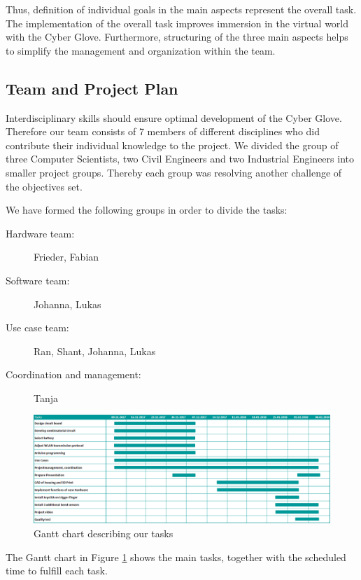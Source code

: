 Thus, definition of individual goals in the main aspects represent the overall task. The implementation of the overall task improves immersion in the virtual world with the Cyber Glove. Furthermore, structuring of the three main aspects helps to simplify the management and organization within the team.



\subsection{Team and Project Plan}

Interdisciplinary skills should ensure optimal development of the Cyber Glove. Therefore our team consists of 7 members of different disciplines who did contribute their individual knowledge to the project. We divided the group of three Computer Scientists, two Civil Engineers and two Industrial Engineers into smaller project groups. Thereby each group was resolving another challenge of the objectives set.

We have formed the following groups in order to divide the tasks:

\begin{description}
	\item[Hardware team:] Frieder, Fabian
	\item[Software team:] Johanna, Lukas
	\item[Use case team:] Ran, Shant, Johanna, Lukas
	\item[Coordination and management:] Tanja
\end{description}

\begin{figure}
	\centering
	\includegraphics[width=\textwidth]{./images/gantt.png}
	\caption{Gantt chart describing our tasks}
	\label{img:gantt}
\end{figure}

The Gantt chart in Figure \ref{img:gantt} shows the main tasks, together with the scheduled time to fulfill each task.  

